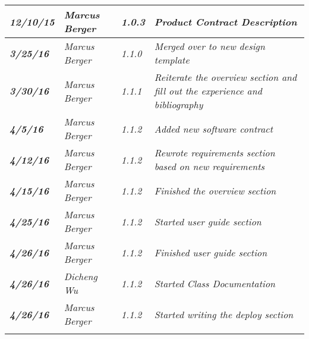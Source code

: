 \begin{tabular}{|>{\raggedright}p{1.5cm}|>{\raggedright}p{3cm}|>{\raggedright}p{1.5cm}|>{\raggedright}p{9cm}|}
\hline
\textit{\textbf{12/10/15}} & \textit{Marcus Berger} & \textit{1.0.3} & \textit{Product Contract Description}\tabularnewline
\hline
\textit{\textbf{3/25/16}} & \textit{Marcus Berger} & \textit{1.1.0} & \textit{Merged over to new design template}\tabularnewline
\hline
\textit{\textbf{3/30/16}} & \textit{Marcus Berger} & \textit{1.1.1} & \textit{Reiterate the overview section and fill out the experience and bibliography}\tabularnewline
\hline
\textit{\textbf{4/5/16}} & \textit{Marcus Berger} & \textit{1.1.2} & \textit{Added new software contract}\tabularnewline
\hline
\textit{\textbf{4/12/16}} & \textit{Marcus Berger} & \textit{1.1.2} & \textit{Rewrote requirements section based on new requirements }\tabularnewline
\hline
\textit{\textbf{4/15/16}} & \textit{Marcus Berger} & \textit{1.1.2} & \textit{Finished the overview section}\tabularnewline
\hline
\textit{\textbf{4/25/16}} & \textit{Marcus Berger} & \textit{1.1.2} & \textit{Started user guide section}\tabularnewline
\hline
\textit{\textbf{4/26/16}} & \textit{Marcus Berger} & \textit{1.1.2} & \textit{Finished user guide section}\tabularnewline
\hline
\textit{\textbf{4/26/16}} & \textit{Dicheng Wu} & \textit{1.1.2} & \textit{Started Class Documentation}\tabularnewline
\hline
\textit{\textbf{4/26/16}} & \textit{Marcus Berger} & \textit{1.1.2} & \textit{Started writing the deploy section}\tabularnewline
\hline
 &  &  & \tabularnewline
\hline
\end{tabular}
\vfill

